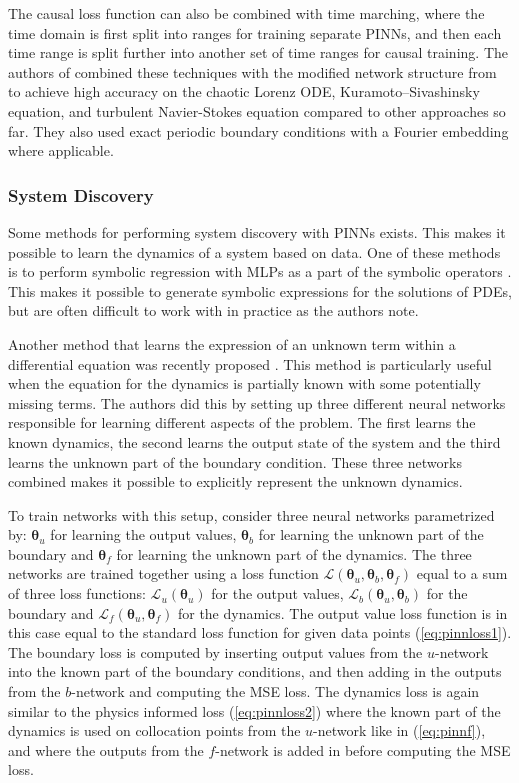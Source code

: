 The causal loss function can also be combined with time marching, where the time domain is first split into ranges for training separate PINNs, and then each time range is split further into another set of time ranges for causal training. The authors of \cite{pinncausality} combined these techniques with the modified network structure from \cite{pinngradientpathology} to achieve high accuracy on the chaotic Lorenz ODE, Kuramoto–Sivashinsky equation, and turbulent Navier-Stokes equation compared to other approaches so far. They also used exact periodic boundary conditions with a Fourier embedding \cite{fourierembedding} where applicable.

\subsubsection{System Discovery}

Some methods for performing system discovery with PINNs exists. This makes it possible to learn the dynamics of a system based on data. One of these methods is to perform symbolic regression with MLPs as a part of the symbolic operators \cite{symbolicpinns}. This makes it possible to generate symbolic expressions for the solutions of PDEs, but are often difficult to work with in practice as the authors note.

Another method that learns the expression of an unknown term within a differential equation was recently proposed \cite{sparsepinndiscovery}. This method is particularly useful when the equation for the dynamics is partially known with some potentially missing terms. The authors did this by setting up three different neural networks responsible for learning different aspects of the problem. The first learns the known dynamics, the second learns the output state of the system and the third learns the unknown part of the boundary condition. These three networks combined makes it possible to explicitly represent the unknown dynamics.

To train networks with this setup, consider three neural networks parametrized by: $\bm{\theta}_u$ for learning the output values, $\bm{\theta}_b$ for learning the unknown part of the boundary and $\bm{\theta}_f$ for learning the unknown part of the dynamics. The three networks are trained together using a loss function $\mathcal{L}(\bm{\theta}_u, \bm{\theta}_b, \bm{\theta}_f)$ equal to a sum of three loss functions: $\mathcal{L}_u(\bm{\theta}_u)$ for the output values, $\mathcal{L}_b(\bm{\theta}_u, \bm{\theta}_b)$ for the boundary and $\mathcal{L}_f(\bm{\theta}_u, \bm{\theta}_f)$ for the dynamics. The output value loss function is in this case equal to the standard loss function for given data points (\ref{eq:pinnloss1}). The boundary loss is computed by inserting output values from the $u$-network into the known part of the boundary conditions, and then adding in the outputs from the $b$-network and computing the MSE loss. The dynamics loss is again similar to the physics informed loss (\ref{eq:pinnloss2}) where the known part of the dynamics is used on collocation points from the $u$-network like in (\ref{eq:pinnf}), and where the outputs from the $f$-network is added in before computing the MSE loss.

